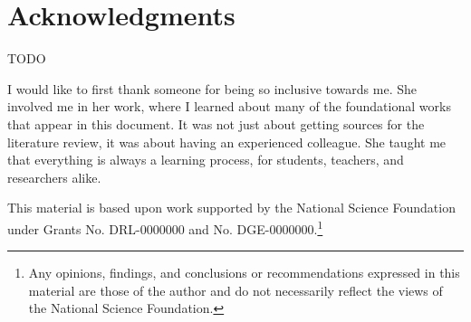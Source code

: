 \chapter*{Acknowledgments}
\renewcommand{\thefootnote}{\fnsymbol{footnote}}

TODO

I would like to first thank someone for being so inclusive towards me. She involved me in her work, where I learned about many of the foundational works that appear in this document. It was not just about getting sources for the literature review, it was about having an experienced colleague.  She taught me that everything is always a learning process, for students, teachers, and researchers alike.

This material is based upon work supported by the National Science Foundation under Grants No. DRL-0000000 and No. DGE-0000000.\footnote{Any opinions, findings, and conclusions or recommendations expressed in this material are those of the author and do not necessarily reflect the views of the National Science Foundation.}